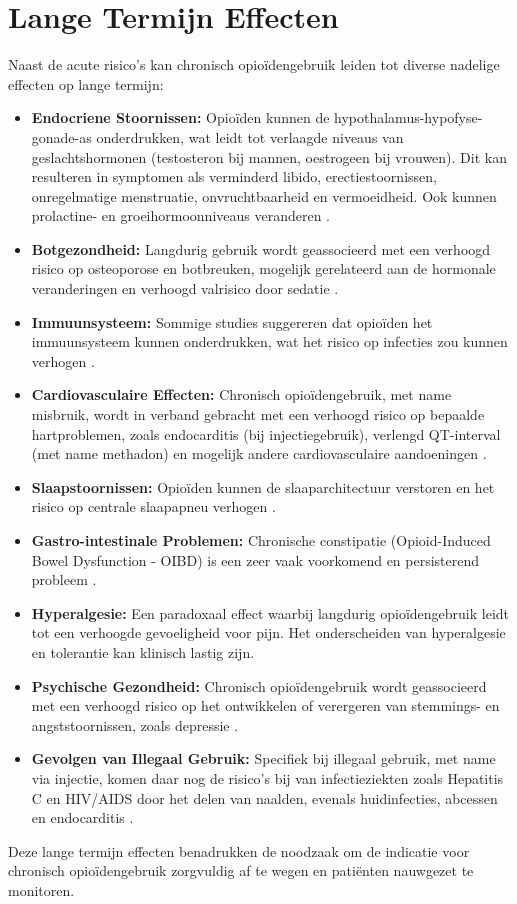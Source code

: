 \documentclass[11pt, a4paper]{report} %
\begin{document}
\section{Lange Termijn Effecten}
Naast de acute risico's kan chronisch opioïdengebruik leiden tot diverse nadelige effecten op lange termijn:
\begin{itemize}
    \item \textbf{Endocriene Stoornissen:} Opioïden kunnen de hypothalamus-hypofyse-gonade-as onderdrukken, wat leidt tot verlaagde niveaus van geslachtshormonen (testosteron bij mannen, oestrogeen bij vrouwen). Dit kan resulteren in symptomen als verminderd libido, erectiestoornissen, onregelmatige menstruatie, onvruchtbaarheid en vermoeidheid. Ook kunnen prolactine- en groeihormoonniveaus veranderen \parencite{EDRV2010OpioidEndocrine}.
    \item \textbf{Botgezondheid:} Langdurig gebruik wordt geassocieerd met een verhoogd risico op osteoporose en botbreuken, mogelijk gerelateerd aan de hormonale veranderingen en verhoogd valrisico door sedatie \parencite{DDDT2011LongTermConsequences}.
    \item \textbf{Immuunsysteem:} Sommige studies suggereren dat opioïden het immuunsysteem kunnen onderdrukken, wat het risico op infecties zou kunnen verhogen \parencite{DDDT2011LongTermConsequences}.
    \item \textbf{Cardiovasculaire Effecten:} Chronisch opioïdengebruik, met name misbruik, wordt in verband gebracht met een verhoogd risico op bepaalde hartproblemen, zoals endocarditis (bij injectiegebruik), verlengd QT-interval (met name methadon) en mogelijk andere cardiovasculaire aandoeningen \parencite{JACC2020CardioComplications}.
    \item \textbf{Slaapstoornissen:} Opioïden kunnen de slaaparchitectuur verstoren en het risico op centrale slaapapneu verhogen \parencite{DDDT2011LongTermConsequences}.
    \item \textbf{Gastro-intestinale Problemen:} Chronische constipatie (Opioid-Induced Bowel Dysfunction - OIBD) is een zeer vaak voorkomend en persisterend probleem \parencite{DDDT2011LongTermConsequences}.
    \item \textbf{Hyperalgesie:} Een paradoxaal effect waarbij langdurig opioïdengebruik leidt tot een verhoogde gevoeligheid voor pijn. Het onderscheiden van hyperalgesie en tolerantie kan klinisch lastig zijn.
    \item \textbf{Psychische Gezondheid:} Chronisch opioïdengebruik wordt geassocieerd met een verhoogd risico op het ontwikkelen of verergeren van stemmings- en angststoornissen, zoals depressie \parencite{PainMed2022MoodAnxiety}.
    \item \textbf{Gevolgen van Illegaal Gebruik:} Specifiek bij illegaal gebruik, met name via injectie, komen daar nog de risico's bij van infectieziekten zoals Hepatitis C en HIV/AIDS door het delen van naalden, evenals huidinfecties, abcessen en endocarditis \parencite{Gupta2010ChemistryOpioids}.
\end{itemize}
Deze lange termijn effecten benadrukken de noodzaak om de indicatie voor chronisch opioïdengebruik zorgvuldig af te wegen en patiënten nauwgezet te monitoren.
\end{document}
